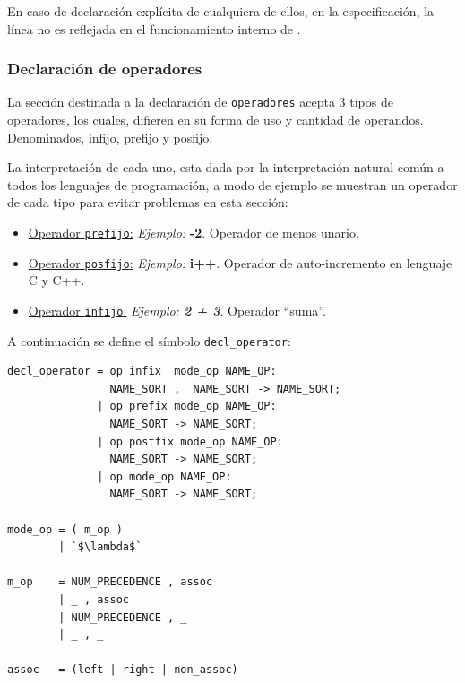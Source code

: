 En caso de declaración explícita de cualquiera de ellos, en la especificación, la línea no es reflejada en el funcionamiento interno de \maggen.

\subsubsection{Declaración de operadores}
La sección destinada a la declaración de \texttt{operadores} acepta 3 tipos de operadores, los cuales, difieren en su forma de uso y cantidad de operandos. Denominados, infijo, prefijo y posfijo. 

La interpretación de cada uno, esta dada por la interpretación natural común a todos los lenguajes de programación, a modo de ejemplo se muestran un operador de cada tipo para evitar problemas en esta sección:

\begin{itemize}
\item \underline{Operador \texttt{prefijo}:} \textit{Ejemplo:} \textbf{-2}. Operador de menos unario. 

\item \underline{Operador \texttt{posfijo}:} \textit{Ejemplo:} \textbf{i++}. Operador de auto-incremento en lenguaje C y C++.

\item \underline{Operador \texttt{infijo}:} \textit{Ejemplo: \textbf{2 + 3}}. Operador ``suma''.
\end{itemize}

A continuación se define el símbolo \texttt{decl\_operator}:

\vspace{0.3cm}
\begin{lstlisting}[frame=shadowbox, rulesepcolor=\color{azul}, language=specmag ]
decl_operator = op infix  mode_op NAME_OP:
                NAME_SORT ,  NAME_SORT -> NAME_SORT;
              | op prefix mode_op NAME_OP:
                NAME_SORT -> NAME_SORT;
              | op postfix mode_op NAME_OP:
                NAME_SORT -> NAME_SORT;
              | op mode_op NAME_OP:
                NAME_SORT -> NAME_SORT;

mode_op = ( m_op )
        | `$\lambda$`

m_op    = NUM_PRECEDENCE , assoc
        | _ , assoc
        | NUM_PRECEDENCE , _
        | _ , _

assoc   = (left | right | non_assoc)
\end{lstlisting}
\vspace{0.3cm}


